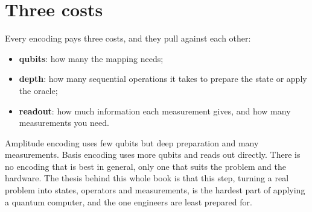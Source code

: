 \section{Three costs}

Every encoding pays three costs, and they pull against each other:

\begin{itemize}
\item \textbf{qubits}: how many the mapping needs;
\item \textbf{depth}: how many sequential operations it takes to prepare the state
or apply the oracle;
\item \textbf{readout}: how much information each measurement gives, and how many
measurements you need.
\end{itemize}

Amplitude encoding uses few qubits but deep preparation and many measurements.
Basis encoding uses more qubits and reads out directly. There is no encoding that
is best in general, only one that suits the problem and the hardware. The thesis
behind this whole book is that this step, turning a real problem into states,
operators and measurements, is the hardest part of applying a quantum computer, and
the one engineers are least prepared for.

